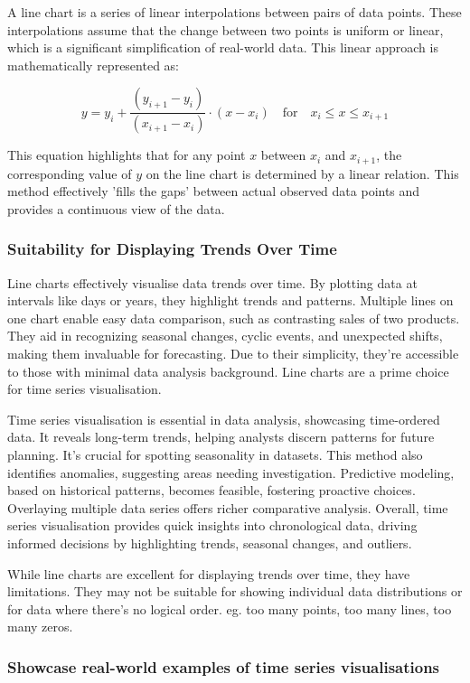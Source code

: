 \documentclass{article}\usepackage[]{graphicx}\usepackage[]{xcolor}
\begin{document}
A line chart is a series of linear interpolations between pairs of data points. These interpolations assume that the change between two points is uniform or linear, which is a significant simplification of real-world data. This linear approach is mathematically represented as:

\[
y = y_i + \frac{(y_{i+1} - y_i)}{(x_{i+1} - x_i)} \cdot (x - x_i) \quad \text{for} \quad x_i \leq x \leq x_{i+1}
\]

This equation highlights that for any point \(x\) between \(x_i\) and \(x_{i+1}\), the corresponding value of \(y\) on the line chart is determined by a linear relation. This method effectively 'fills the gaps' between actual observed data points and provides a continuous view of the data.

\subsubsection{Suitability for Displaying Trends Over Time}
Line charts effectively visualise data trends over time. By plotting data at intervals like days or years, they highlight trends and patterns. Multiple lines on one chart enable easy data comparison, such as contrasting sales of two products. They aid in recognizing seasonal changes, cyclic events, and unexpected shifts, making them invaluable for forecasting. Due to their simplicity, they're accessible to those with minimal data analysis background. Line charts are a prime choice for time series visualisation.

Time series visualisation is essential in data analysis, showcasing time-ordered data. It reveals long-term trends, helping analysts discern patterns for future planning. It's crucial for spotting seasonality in datasets. This method also identifies anomalies, suggesting areas needing investigation. Predictive modeling, based on historical patterns, becomes feasible, fostering proactive choices. Overlaying multiple data series offers richer comparative analysis. Overall, time series visualisation provides quick insights into chronological data, driving informed decisions by highlighting trends, seasonal changes, and outliers.

While line charts are excellent for displaying trends over time, they have limitations. They may not be suitable for showing individual data distributions or for data where there's no logical order. eg. too many points, too many lines, too many zeros.

\subsubsection{Showcase real-world examples of time series visualisations}
\end{document}
